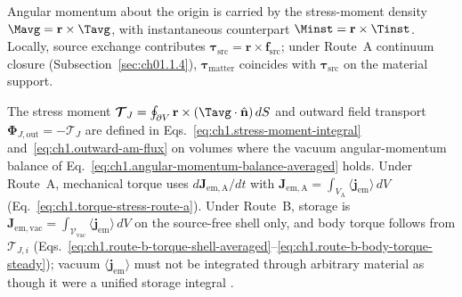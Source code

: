 Angular momentum about the origin is carried by the stress-moment density $\Mavg=\mathbf{r}\times\Tavg$, with instantaneous counterpart $\Minst=\mathbf{r}\times\Tinst$. Locally, source exchange contributes $\boldsymbol{\tau}_{\mathrm{src}}=\mathbf{r}\times\mathbf{f}_{\mathrm{src}}$; under Route~A continuum closure (Subsection~\ref{sec:ch01.1.4}), $\boldsymbol{\tau}_{\mathrm{matter}}$ coincides with $\boldsymbol{\tau}_{\mathrm{src}}$ on the material support.

The stress moment $\boldsymbol{\mathcal{T}}_J=\oint_{\partial V}\mathbf{r}\times(\Tavg\cdot\hat{\mathbf{n}})\,dS$ and outward field transport $\boldsymbol{\Phi}_{J,\mathrm{out}}=-\boldsymbol{\mathcal{T}}_J$ are defined in Eqs.~\eqref{eq:ch1.stress-moment-integral} and~\eqref{eq:ch1.outward-am-flux} on volumes where the vacuum angular-momentum balance of Eq.~\eqref{eq:ch1.angular-momentum-balance-averaged} holds. Under Route~A, mechanical torque uses $d\mathbf{J}_{\mathrm{em,A}}/dt$ with $\mathbf{J}_{\mathrm{em,A}}=\int_{V_{\mathrm{A}}}\langle\mathbf{j}_{\mathrm{em}}\rangle\,dV$ (Eq.~\eqref{eq:ch1.torque-stress-route-a}). Under Route~B, storage is $\mathbf{J}_{\mathrm{em,vac}}=\int_{\mathcal{V}_{\mathrm{vac}}}\langle\mathbf{j}_{\mathrm{em}}\rangle\,dV$ on the source-free shell only, and body torque follows from $\boldsymbol{\mathcal{T}}_{J,i}$ (Eqs.~\eqref{eq:ch1.route-b-torque-shell-averaged}--\eqref{eq:ch1.route-b-body-torque-steady}); vacuum $\langle\mathbf{j}_{\mathrm{em}}\rangle$ must not be integrated through arbitrary material as though it were a unified storage integral \cite{beth1936,stratton1941,harrington2001}.

